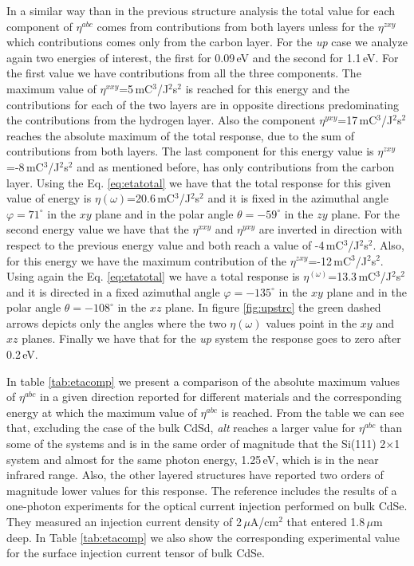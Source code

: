 \documentclass[pss]{wiley2sp} %
\begin{document}
In a similar way than in the previous structure analysis the total value for each component of $\eta^{abc}$ comes from contributions from both layers unless for the  $\eta^{zxy}$ which contributions comes only from the carbon layer. For the \emph{up} case we analyze again two energies of interest, the first for 0.09\,eV and the second for 1.1\,eV. For the first value we have contributions from all the three components. The maximum value of $\eta^{xxy}$=5\,mC$^{3}$/J$^{2}$s$^{2}$ is reached for this energy and the contributions for each of the two layers are in opposite directions predominating the contributions from the hydrogen layer. Also the component $\eta^{yxy}$=17\,mC$^{3}$/J$^{2}$s$^{2}$ reaches the absolute maximum of the total response, due to the sum of contributions from both layers. The last component for this energy value is $\eta^{zxy}$=-8\,mC$^{3}$/J$^{2}$s$^{2}$ and as mentioned before, has only contributions from the carbon layer. Using the Eq. \ref{eq:etatotal} we have that the total response for this given value of energy is $\eta(\omega)$=20.6\,mC$^{3}$/J$^{2}$s$^{2}$ and it is fixed in the azimuthal angle $\varphi=71^{\circ}$ in the $xy$ plane and in the polar angle $\theta=-59^{\circ}$ in the $zy$ plane. For the second energy value we have that the $\eta^{xxy}$ and $\eta^{yxy}$ are inverted in direction with respect to the previous energy value and both reach a value of -4\,mC$^{3}$/J$^{2}$s$^{2}$. Also, for this energy we have the maximum contribution of the $\eta^{zxy}$=-12\,mC$^{3}$/J$^{2}$s$^{2}$. Using again the Eq. \eqref{eq:etatotal} we have a total response is $\eta^(\omega)$=13.3\,mC$^{3}$/J$^{2}$s$^{2}$ and it is directed in a fixed azimuthal angle $\varphi=-135^{\circ}$ in the $xy$ plane and in the polar angle $\theta=-108^{\circ}$ in the $xz$ plane. In figure \ref{fig:upstrc} the green dashed arrows depicts only the angles where the two $\eta(\omega)$ values point in the $xy$ and $xz$ planes. Finally we have that for the \emph{up} system the response goes to zero after 0.2\,eV. 

In table \ref{tab:etacomp} we present a comparison of the absolute maximum values of $\eta^{abc}$ in a given direction reported for different materials and the corresponding energy at which the maximum value of $\eta^{abc}$ is reached. From the table we can see that, excluding the case of the bulk CdSd, \emph{alt} reaches a larger value for $\eta^{abc}$ than some of the systems and is in the same order of magnitude that the Si(111) 2$\times$1 system and almost for the same photon energy, 1.25\,eV, which is in the near infrared range. Also, the other layered structures have reported two orders of magnitude lower values for this response. The reference \cite{lamanAPL99} includes the results of a one-photon experiments for the optical current injection performed on bulk CdSe. They measured an injection current density of 2\,$\mu$A/cm$^{2}$ that entered 1.8\,$\mu$m deep. In Table \ref{tab:etacomp} we also show the corresponding experimental value for the surface injection current tensor of bulk CdSe.
\end{document}
